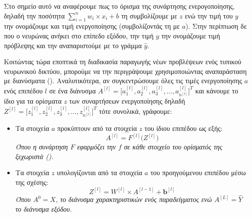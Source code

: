 Στο σημείο αυτό να αναφέρουμε πως το όρισμα της συνάρτησης ενερογοποίησης, δηλαδή την ποσότητα \(\sum_{i = 1}^{n} w_i \times x_i  +  b\) τη συμβολίζουμε με $z$ ενώ την τιμή του $y$ την ονομάζουμε και τιμή ενεργοποίησης (συμβολίζοντάς τη με $a$). Στην περίπτωση δε που ο νευρώνας ανήκει στο επίπεδο εξόδου, την τιμή $y$ την ονομάζουμε τιμή πρόβλεψης και την αναπαριστούμε με το γράμμα $\hat{y}$. \par

Κοιτώντας τώρα εποπτικά τη διαδικασία παραγωγής νέων προβλέψεων ενός τυπικού νευρωνικού δικτύου, μπορούμε να την περιγράψουμε χρησιμοποιώντας αναπαράσταση με διανύσματα (). Αναλυτικότερα, αν συγκεντρώσουμε όλες τις τιμές ενεργοποίησης $a$ ενός επιπέδου $l$ σε ένα διάνυσμα \(A^{[l]} = \big[a_1^{[l]}, a_2^{[l]}, a_3^{[l]}, \dots, a_{n^{[l]}}^{[l]}]^T\) και κάνουμε το ίδιο για τα ορίσματα $z$ των συναρτήσεων ενεργοποίησης δηλαδή \(Z^{[l]} = \big[z_1^{[l]}, z_2^{[l]}, z_3^{[l]}, \dots, z_{n^{[l]}}^{[l]}]^T\) τότε συνολικά, γράφουμε:
\begin{itemize}
  \item Τα στοιχεία $a$ προκύπτουν από τα στοιχεία $z$ του ίδιου επιπέδου ως εξής:
    \begin{equation} \label{eq:1}
      A^{[l]} = F^{[l]}\big(Z^{[l]}\big)
    \end{equation}
    \textit{Όπου η συνάρτηση $F$ εφαρμόζει την $f$ σε κάθε στοιχείο του ορίσματός της ξεχωριστά ().}
  \item Τα στοιχεία $z$ υπολογίζονται από τα στοιχεία $a$ του προηγούμενου επιπέδου μέσω της σχέσης:
    \begin{equation} \label{eq:2}
      Z^{[l]} = W^{[l]} \times A^{[l-1]} + \boldsymbol{b}^{[l]}
    \end{equation}
    \textit{Όπου $A^{0} = X$, το διάνυσμα χαρακτηριστικών ενός παραδείγματος ενώ $A^{[L]} = \hat{Y}$ το διάνυσμα εξόδου.}
\end{itemize}

